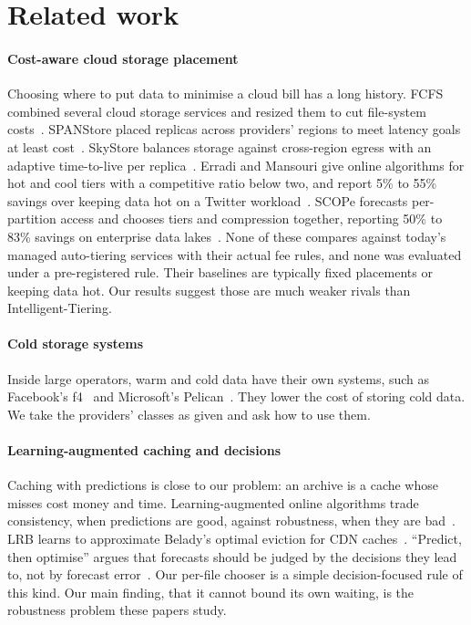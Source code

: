 \documentclass[11pt]{article}
\begin{document}
\section{Related work}
\label{sec:related}

\paragraph{Cost-aware cloud storage placement} Choosing where to put data to minimise a cloud bill has a long history. FCFS combined several cloud storage services and resized them to cut file-system costs~\cite{puttaswamy2012frugal}. SPANStore placed replicas across providers' regions to meet latency goals at least cost~\cite{wu2013spanstore}. SkyStore balances storage against cross-region egress with an adaptive time-to-live per replica~\cite{liu2025skystore}. Erradi and Mansouri give online algorithms for hot and cool tiers with a competitive ratio below two, and report 5\% to 55\% savings over keeping data hot on a Twitter workload~\cite{erradi2020online}. SCOPe forecasts per-partition access and chooses tiers and compression together, reporting 50\% to 83\% savings on enterprise data lakes~\cite{mukherjee2023scope}. None of these compares against today's managed auto-tiering services with their actual fee rules, and none was evaluated under a pre-registered rule. Their baselines are typically fixed placements or keeping data hot. Our results suggest those are much weaker rivals than Intelligent-Tiering.

\paragraph{Cold storage systems} Inside large operators, warm and cold data have their own systems, such as Facebook's f4~\cite{muralidhar2014f4} and Microsoft's Pelican~\cite{balakrishnan2014pelican}. They lower the cost of storing cold data. We take the providers' classes as given and ask how to use them.

\paragraph{Learning-augmented caching and decisions} Caching with predictions is close to our problem: an archive is a cache whose misses cost money and time. Learning-augmented online algorithms trade consistency, when predictions are good, against robustness, when they are bad~\cite{lykouris2018competitive,wei2020robustness}. LRB learns to approximate Belady's optimal eviction for CDN caches~\cite{song2020lrb}. ``Predict, then optimise'' argues that forecasts should be judged by the decisions they lead to, not by forecast error~\cite{elmachtoub2022spo}. Our per-file chooser is a simple decision-focused rule of this kind. Our main finding, that it cannot bound its own waiting, is the robustness problem these papers study.
\end{document}
